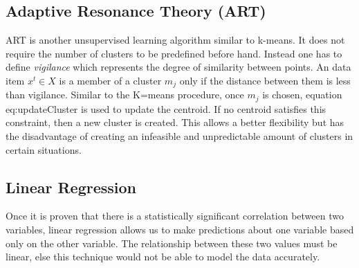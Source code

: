 \documentclass{mproj}
\begin{document}
\subsection{Adaptive Resonance Theory (ART)}
\label{sec:artExplanation}
ART\cite{art} is another unsupervised learning algorithm similar to k-means. It does not require the number of clusters to be predefined before hand. Instead one has to define \textit{vigilance} which represents the degree of similarity between points. An data item $x^t \in X$ is a member of a cluster $m_j$ only if the distance between them is less than vigilance. Similar to the K=means procedure, once $m_j$ is chosen, equation {eq:updateCluster} is used to update the centroid. If no centroid satisfies this constraint, then a new cluster is created. This allows a better flexibility but has the disadvantage of creating an infeasible and unpredictable amount of clusters in certain situations.

\subsection{Linear Regression}
\label{linearregression}
Once it is proven that there is a statistically significant correlation between two variables, linear regression allows us to make predictions about one variable based only on the other variable. The relationship between these two values must be linear, else this technique would not be able to model the data accurately.
\end{document}
